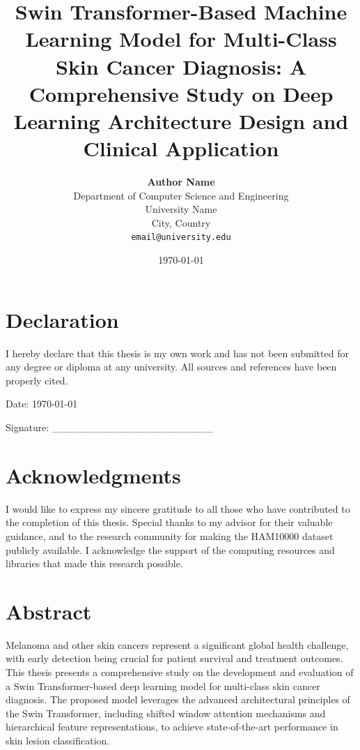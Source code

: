 \documentclass[11pt,a4paper]{report}
\title{Swin Transformer-Based Machine Learning Model for Multi-Class Skin Cancer Diagnosis: A Comprehensive Study on Deep Learning Architecture Design and Clinical Application}
\author{
    \textbf{Author Name}\\[0.5cm]
    Department of Computer Science and Engineering\\
    University Name\\
    City, Country\\[0.5cm]
    \texttt{email@university.edu}
}
\date{\today}
\begin{document}
\onehalfspacing

\maketitle

\chapter*{Declaration}
I hereby declare that this thesis is my own work and has not been submitted for any degree or diploma at any university. All sources and references have been properly cited.

\vspace{2cm}
\noindent Date: \today

\vspace{1cm}
\noindent Signature: \_\_\_\_\_\_\_\_\_\_\_\_\_\_\_\_\_\_\_\_\_\_

\newpage

\chapter*{Acknowledgments}
I would like to express my sincere gratitude to all those who have contributed to the completion of this thesis. Special thanks to my advisor for their valuable guidance, and to the research community for making the HAM10000 dataset publicly available. I acknowledge the support of the computing resources and libraries that made this research possible.

\newpage

\chapter*{Abstract}

Melanoma and other skin cancers represent a significant global health challenge, with early detection being crucial for patient survival and treatment outcomes. This thesis presents a comprehensive study on the development and evaluation of a Swin Transformer-based deep learning model for multi-class skin cancer diagnosis. The proposed model leverages the advanced architectural principles of the Swin Transformer, including shifted window attention mechanisms and hierarchical feature representations, to achieve state-of-the-art performance in skin lesion classification.
\end{document}
